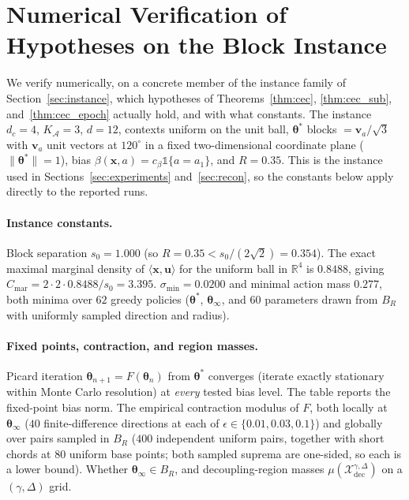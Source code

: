 \documentclass[11pt]{article}
\begin{document}
\appendix
\section{Numerical Verification of Hypotheses on the Block Instance}
\label{sec:numverify}

We verify numerically, on a concrete member of the instance family of
Section~\ref{sec:instance}, which hypotheses of
Theorems~\ref{thm:cec}, \ref{thm:cec_sub}, and~\ref{thm:cec_epoch}
actually hold, and with what constants.  The instance $d_c=4$,
$K_{\mathcal A}=3$, $d=12$, contexts uniform on the unit ball,
$\bm\theta^{\!*}$ blocks $=\bm v_a/\sqrt3$ with $\bm v_a$ unit vectors
at $120^\circ$ in a fixed two-dimensional coordinate plane
($\|\bm\theta^{\!*}\|=1$), bias
$\beta(\bm x,a)=c_\beta\mathbb 1\{a=a_1\}$, and $R=0.35$.  This is the
instance used in Sections~\ref{sec:experiments} and~\ref{sec:recon},
so the constants below apply directly to the reported runs.

\paragraph{Instance constants.}
Block separation $s_0=1.000$ (so $R=0.35<s_0/(2\sqrt2)=0.354$). The
exact maximal marginal density of $\langle\bm x,\bm u\rangle$ for
the uniform ball in $\mathbb R^4$ is $0.8488$, giving
$C_{\mathrm{mar}}=2\cdot2\cdot0.8488/s_0=3.395$.
$\sigma_{\min}=0.0200$ and minimal action mass $0.277$, both minima
over $62$ greedy policies ($\bm\theta^{\!*}$, $\bm\theta_\infty$, and
$60$ parameters drawn from $B_R$ with uniformly sampled direction and
radius).

\paragraph{Fixed points, contraction, and region masses.}
Picard iteration $\bm\theta_{n+1}=F(\bm\theta_n)$ from
$\bm\theta^{\!*}$ converges (iterate exactly stationary within Monte
Carlo resolution) at \emph{every} tested bias level.  The table
reports the fixed-point bias norm. The empirical contraction modulus
of $F$, both locally at $\bm\theta_\infty$ ($40$ finite-difference
directions at each of $\epsilon\in\{0.01,0.03,0.1\}$) and globally over
pairs sampled in $B_R$ ($400$ independent uniform pairs, together with
short chords at $80$ uniform base points; both sampled suprema are
one-sided, so each is a lower bound). Whether $\bm\theta_\infty\in B_R$, and decoupling-region masses
$\mu(\mathcal X_{\mathrm{dec}}^{\gamma,\Delta})$ on a $(\gamma,\Delta)$
grid.
\end{document}
